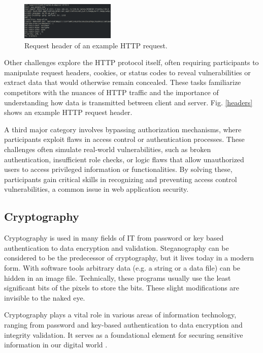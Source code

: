 \documentclass[conference]{IEEEtran}
\begin{document}
\begin{figure}[htbp]
	\centering
	\includegraphics[width=0.4\textwidth]{fig/headers.png}
	\caption{Request header of an example HTTP request.}
	\label{fig-headers}
\end{figure}

Other challenges explore the HTTP protocol itself, often requiring participants
to manipulate request headers, cookies, or status codes to reveal
vulnerabilities or extract data that would otherwise remain concealed. These
tasks familiarize competitors with the nuances of HTTP traffic and the
importance of understanding how data is transmitted between client and server.
Fig. \ref{headers} shows an example HTTP request header.

A third major category involves bypassing authorization mechanisms, where
participants exploit flaws in access control or authentication processes. These
challenges often simulate real-world vulnerabilities, such as broken
authentication, insufficient role checks, or logic flaws that allow
unauthorized users to access privileged information or functionalities. By
solving these, participants gain critical skills in recognizing and preventing
access control vulnerabilities, a common issue in web application security.

\subsection{Cryptography}

Cryptography is used in many fields of IT from password or key based authentication
to data encryption and validation. Steganography can be considered to be the
predecessor of cryptography, but it lives today in a modern form. With software
tools arbitrary data (e.g. a string or a data file) can be hidden in an image file.
Technically, these programs usually use the least significant bits of the pixels
to store the bits. These slight modifications are invisible to the naked eye.

Cryptography plays a vital role in various areas of information technology,
ranging from password and key-based authentication to data encryption and
integrity validation. It serves as a foundational element for securing
sensitive information in our digital world
\cite{luciano1987}.
\end{document}
